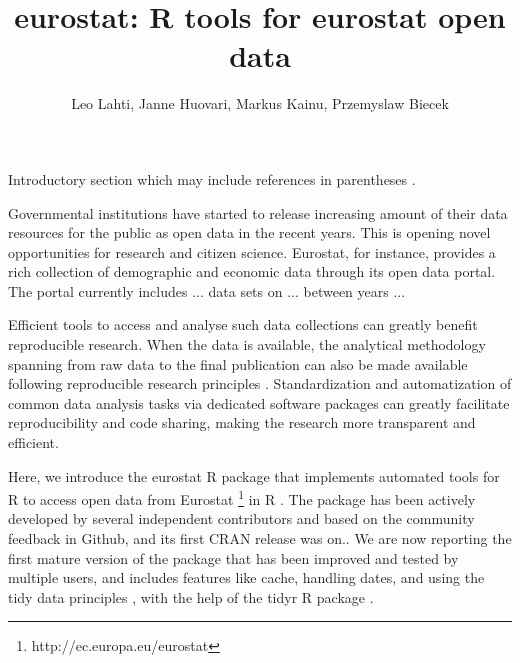 \title{eurostat: R tools for eurostat open data}
\author{Leo Lahti, Janne Huovari, Markus Kainu, Przemyslaw Biecek}

\maketitle




Introductory section which may include references in parentheses
\citep{R}.

Governmental institutions have started to release increasing amount of
their data resources for the public as open data in the recent
years. This is opening novel opportunities for research and citizen
science. Eurostat, for instance, provides a rich collection of
demographic and economic data through its open data portal. The portal
currently includes ... data sets on ... between years ...

Efficient tools to access and analyse such data collections can
greatly benefit reproducible research. When the data is available, the
analytical methodology spanning from raw data to the final publication
can also be made available following reproducible research principles
\citep{Gandrud13}. Standardization and automatization of
common data analysis tasks via dedicated software packages can greatly
facilitate reproducibility and code sharing, making the research more
transparent and efficient.

Here, we introduce the eurostat R package that implements automated
tools for R to access open data from
Eurostat \footnote{http://ec.europa.eu/eurostat} in
R \citep{R}. The package has been actively developed by several
independent contributors and based on the community feedback in
Github, and its first CRAN release was on.. We are now reporting the
first mature version of the package that has been improved and tested
by multiple users, and includes features like cache, handling dates,
and using the tidy data principles \citep{wickham2014}, with the help of
the tidyr R package \citep{tidyr}.

